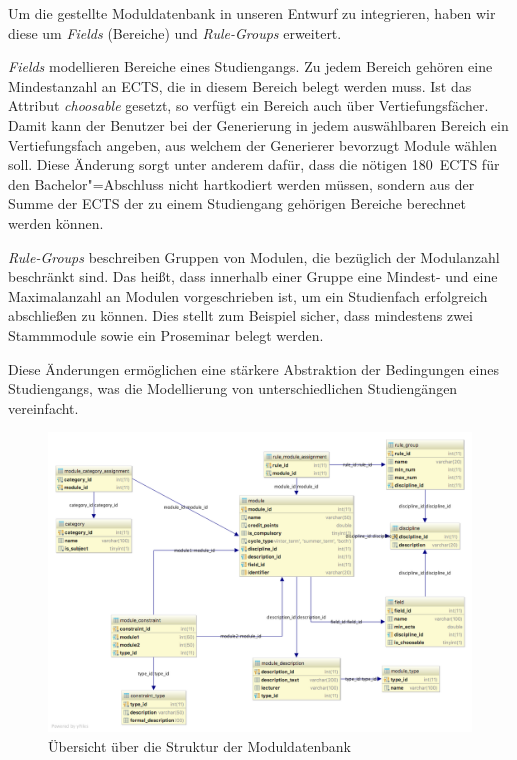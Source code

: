 Um die gestellte Moduldatenbank in unseren Entwurf zu integrieren, haben wir diese um \textit{Fields} (Bereiche) und \textit{Rule-Groups} erweitert.

\textit{Fields} modellieren Bereiche eines Studiengangs. Zu jedem Bereich gehören eine Mindestanzahl an ECTS, die in diesem Bereich belegt werden muss. Ist das Attribut \textit{choosable} gesetzt, so verfügt ein Bereich auch über Vertiefungsfächer. Damit kann der Benutzer bei der Generierung in jedem auswählbaren Bereich ein Vertiefungsfach angeben, aus welchem der Generierer bevorzugt Module wählen soll. Diese Änderung sorgt unter anderem dafür, dass die nötigen 180~ECTS für den Bachelor"=Abschluss nicht hartkodiert werden müssen, sondern aus der Summe der ECTS der zu einem Studiengang gehörigen Bereiche berechnet werden können.

\textit{Rule-Groups} beschreiben Gruppen von Modulen, die bezüglich der  Modulanzahl beschränkt sind. Das heißt, dass innerhalb einer Gruppe eine Mindest- und eine Maximalanzahl an Modulen vorgeschrieben ist, um ein Studienfach erfolgreich abschließen zu können. Dies stellt zum Beispiel sicher, dass mindestens zwei Stammmodule sowie ein Proseminar belegt werden.

Diese Änderungen ermöglichen eine stärkere Abstraktion der Bedingungen eines Studiengangs, was die Modellierung von unterschiedlichen Studiengängen vereinfacht.

\begin{figure}
	\includegraphics[width = \textwidth]{diagrams/module_diagram.png}
	\caption{Übersicht über die Struktur der Moduldatenbank}
\end{figure}